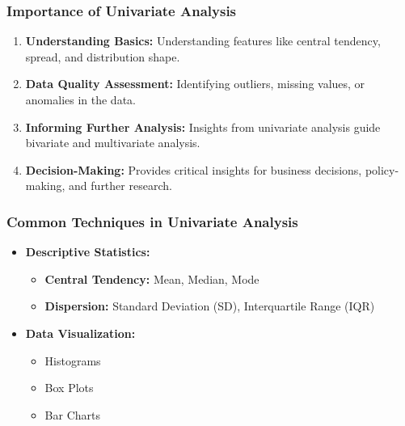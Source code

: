 \documentclass{beamer}
\begin{document}
\begin{frame}[fragile]
    \frametitle{Importance of Univariate Analysis}
    \begin{enumerate}
        \item \textbf{Understanding Basics:} 
        Understanding features like central tendency, spread, and distribution shape.
        
        \item \textbf{Data Quality Assessment:} 
        Identifying outliers, missing values, or anomalies in the data.
        
        \item \textbf{Informing Further Analysis:} 
        Insights from univariate analysis guide bivariate and multivariate analysis.
        
        \item \textbf{Decision-Making:} 
        Provides critical insights for business decisions, policy-making, and further research.
    \end{enumerate}
\end{frame}

\begin{frame}[fragile]
    \frametitle{Common Techniques in Univariate Analysis}
    \begin{itemize}
        \item \textbf{Descriptive Statistics:}
            \begin{itemize}
                \item \textbf{Central Tendency:} Mean, Median, Mode
                \item \textbf{Dispersion:} Standard Deviation (SD), Interquartile Range (IQR)
            \end{itemize}
        
        \item \textbf{Data Visualization:}
            \begin{itemize}
                \item Histograms
                \item Box Plots
                \item Bar Charts
            \end{itemize}
    \end{itemize}
\end{frame}
\end{document}
